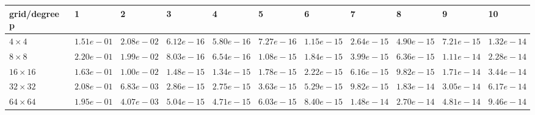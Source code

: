 \begin{tabular}{lllllllllll}
\hline
 grid/degree p   & 1          & 2          & 3          & 4          & 5          & 6          & 7          & 8          & 9          & 10         \\
\hline
 $4 \times 4$    & $1.51e-01$ & $2.08e-02$ & $6.12e-16$ & $5.80e-16$ & $7.27e-16$ & $1.15e-15$ & $2.64e-15$ & $4.90e-15$ & $7.21e-15$ & $1.32e-14$ \\
 $8 \times 8$    & $2.20e-01$ & $1.99e-02$ & $8.03e-16$ & $6.54e-16$ & $1.08e-15$ & $1.84e-15$ & $3.99e-15$ & $6.36e-15$ & $1.11e-14$ & $2.28e-14$ \\
 $16 \times 16$  & $1.63e-01$ & $1.00e-02$ & $1.48e-15$ & $1.34e-15$ & $1.78e-15$ & $2.22e-15$ & $6.16e-15$ & $9.82e-15$ & $1.71e-14$ & $3.44e-14$ \\
 $32 \times 32$  & $2.08e-01$ & $6.83e-03$ & $2.86e-15$ & $2.75e-15$ & $3.63e-15$ & $5.29e-15$ & $9.82e-15$ & $1.83e-14$ & $3.05e-14$ & $6.17e-14$ \\
 $64 \times 64$  & $1.95e-01$ & $4.07e-03$ & $5.04e-15$ & $4.71e-15$ & $6.03e-15$ & $8.40e-15$ & $1.48e-14$ & $2.70e-14$ & $4.81e-14$ & $9.46e-14$ \\
\hline
\end{tabular}